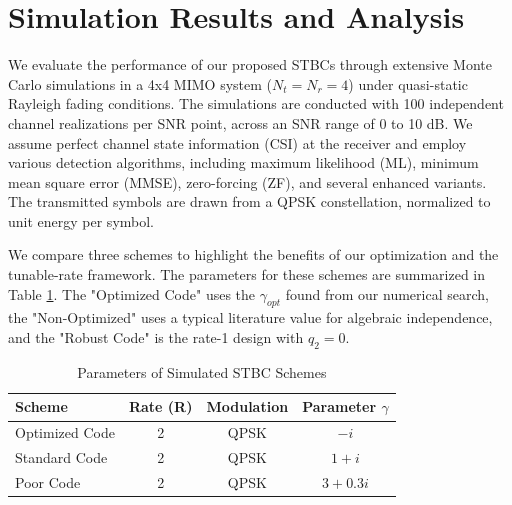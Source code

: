 \section{Simulation Results and Analysis}
We evaluate the performance of our proposed STBCs through extensive Monte Carlo simulations in a 4x4 MIMO system (\(N_t = N_r = 4\)) under quasi-static Rayleigh fading conditions. The simulations are conducted with 100 independent channel realizations per SNR point, across an SNR range of 0 to 10 dB. We assume perfect channel state information (CSI) at the receiver and employ various detection algorithms, including maximum likelihood (ML), minimum mean square error (MMSE), zero-forcing (ZF), and several enhanced variants. The transmitted symbols are drawn from a QPSK constellation, normalized to unit energy per symbol.

We compare three schemes to highlight the benefits of our optimization and the tunable-rate framework. The parameters for these schemes are summarized in Table \ref{tab:params}. The "Optimized Code" uses the \(\gamma_{opt}\) found from our numerical search, the "Non-Optimized" uses a typical literature value for algebraic independence, and the "Robust Code" is the rate-1 design with \(q_2 = 0\).

\begin{table}[h]
\caption{Parameters of Simulated STBC Schemes}
\label{tab:params}
\centering
\begin{tabular}{|l|c|c|c|}
\hline
\textbf{Scheme} & \textbf{Rate (R)} & \textbf{Modulation} & \textbf{Parameter \(\gamma\)} \\
\hline
Optimized Code & 2 & QPSK & \(-i\) \\
Standard Code & 2 & QPSK & \(1 + i\) \\
Poor Code & 2 & QPSK & \(3 + 0.3i\) \\
\hline
\end{tabular}
\end{table}

